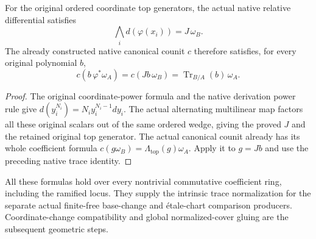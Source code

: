 \begin{theorem}
\label{thm:kn-nadel-canonical-counit-intrinsic-trace}
\leanok
{}
For the original ordered coordinate top generators, the actual native
relative differential satisfies
\[
  \bigwedge_i d(\varphi(x_i))=J\,\omega_B.
\]
The already constructed native canonical counit $c$ therefore satisfies,
for every original polynomial $b$,
\[
  c(b\,\varphi^*\omega_A)
    =c(Jb\,\omega_B)=\operatorname{Tr}_{B/A}(b)\,\omega_A.
\]
\end{theorem}
\begin{proof}
The original coordinate-power formula and the native derivation power rule
give $d(y_i^{N_i})=N_i y_i^{N_i-1}dy_i$.  The actual alternating multilinear
map factors all these original scalars out of the same ordered wedge,
giving the proved $J$ and the retained original top generator.
The actual canonical counit already has its whole coefficient formula
$c(g\omega_B)=\Lambda_{\mathrm{top}}(g)\omega_A$.
Apply it to $g=Jb$ and use the preceding native trace identity.
\end{proof}

All these formulas hold over every nontrivial commutative coefficient ring,
including the ramified locus.  They supply the intrinsic trace normalization
for the separate actual finite-free base-change and \'etale-chart comparison
producers.  Coordinate-change compatibility and global normalized-cover
gluing are the subsequent geometric steps.
